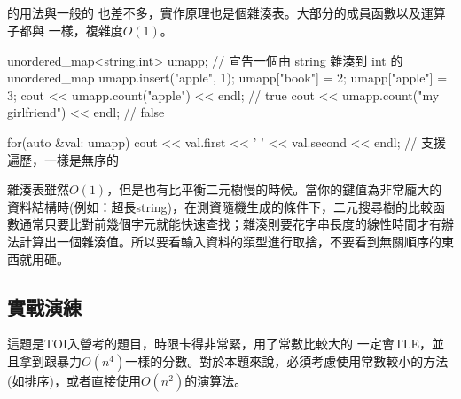\subsection{}
 的用法與一般的  也差不多，實作原理也是個雜湊表。大部分的成員函數以及運算子都與  一樣，複雜度$O(1)$。
\begin{C++}
unordered_map<string,int> umapp;
// 宣告一個由 string 雜湊到 int 的 unordered_map
umapp.insert({"apple", 1});
umapp["book"] = 2;
umapp["apple"] = 3;
cout << umapp.count("apple") << endl; // true
cout << umapp.count("my girlfriend") << endl; // false

for(auto &val: umapp)
    cout << val.first << ' ' << val.second << endl;
// 支援遍歷，一樣是無序的
\end{C++}
\indent\indent 雜湊表雖然$O(1)$，但是也有比平衡二元樹慢的時候。當你的鍵值為非常龐大的資料結構時(例如：超長string)，在測資隨機生成的條件下，二元搜尋樹的比較函數通常只要比對前幾個字元就能快速查找；雜湊則要花字串長度的線性時間才有辦法計算出一個雜湊值。所以要看輸入資料的類型進行取捨，不要看到無關順序的東西就用砸。
\subsection{實戰演練}
這題是TOI入營考的題目，時限卡得非常緊，用了常數比較大的  一定會TLE，並且拿到跟暴力$O(n^4)$一樣的分數。對於本題來說，必須考慮使用常數較小的方法(如排序)，或者直接使用$O(n^2)$的演算法。
